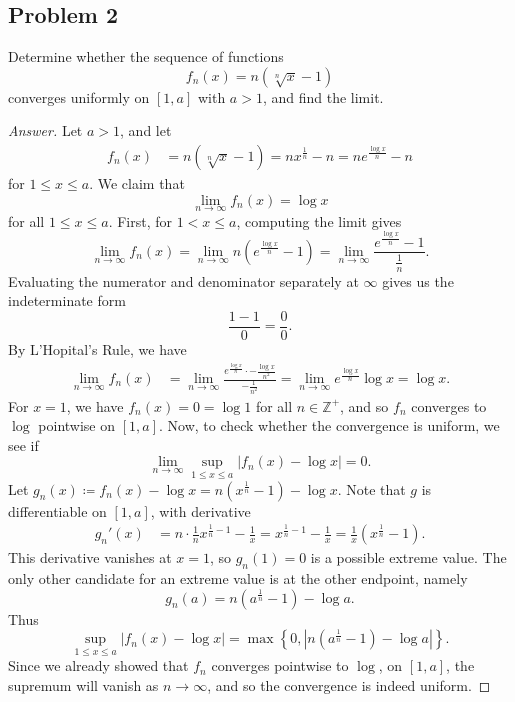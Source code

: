 \documentclass[12pt]{article}
\newcommand{\z}{\mathbb{Z}}
\newcommand\paren[1]{\left( #1 \right)}
\newcommand\setb[1]{\left \{ #1 \right \}}
\newcommand{\abs}[1]{\left | #1 \right |}
\theoremstyle{definition}
\begin{document}
\subsection{Problem 2}
Determine whether the sequence of functions
\[
    f_n(x) = n \paren{ \sqrt[n]{x} - 1 }
\]
converges uniformly on $[1,a]$ with $a > 1$, and find the limit.
\begin{proof}[Answer]
    Let $a > 1$, and let 
    \begin{align*}
        f_n(x) & = n \paren{ \sqrt[n]{x} - 1 } = n x^{\frac{1}{n}} - n = n e^{\frac{\log x}{n}} - n
    \end{align*}
    for $1 \leq x \leq a$. We claim that 
    \[
        \lim\limits_{n \to \infty} f_n(x) = \log x
    \]
    for all $1 \leq x \leq a$. First, for $1 < x \leq a$, computing the limit gives 
    \[
        \lim\limits_{n \to \infty} f_n(x) = \lim\limits_{n \to \infty} n \paren{ e^{\frac{\log x}{n}} - 1 } = \lim\limits_{n \to \infty} \frac{ e^{\frac{\log x}{n}} - 1 }{ \frac{1}{n} }.
    \]
    Evaluating the numerator and denominator separately at $\infty$ gives us the indeterminate form
    \[
        \frac{1 - 1}{0} = \frac{0}{0}.
    \]
    By L'Hopital's Rule, we have 
    \begin{align*}
        \lim\limits_{n \to \infty} f_n(x) & =  \lim\limits_{n \to \infty} \frac{ e^{\frac{\log x}{n}} \cdot -\frac{\log x}{n^2} }{-\frac{1}{n^2}} =  \lim\limits_{n \to \infty} e^{\frac{\log x}{n}} \log x = \log x.
    \end{align*}
    For $x = 1$, we have $f_n(x) = 0 = \log 1$ for all $n \in \z^+$, and so $f_n$ converges to $\log$ pointwise on $[1,a]$. 
    Now, to check whether the convergence is uniform, we see if 
    \[
        \lim\limits_{n \to \infty} \sup\limits_{1 \leq x \leq a} \abs{ f_n(x) - \log x } = 0.
    \]
    Let $g_n(x) \coloneqq f_n(x) - \log x = n \paren{ x^{\frac{1}{n}} - 1 } - \log x$. Note that $g$ is differentiable on $[1,a]$, with derivative
    \begin{align*}
        g_n'(x) & = n \cdot \frac{1}{n} x^{\frac{1}{n} - 1} - \frac{1}{x} = x^{\frac{1}{n} - 1} - \frac{1}{x} = \frac{1}{x} \paren{ x^{\frac{1}{n}} - 1 }.
    \end{align*}
    This derivative vanishes at $x = 1$, so $g_n(1) = 0$ is a possible extreme value. The only other candidate for an extreme value is at the other endpoint, namely
    \[
        g_n(a) = n \paren{ a^{\frac{1}{n}} - 1 } - \log a.
    \]
    Thus 
    \[
        \sup\limits_{1 \leq x \leq a} \abs{ f_n(x) - \log x } = \max \setb{ 0 , \abs{ n \paren{ a^{\frac{1}{n}} - 1 } - \log a } }.
    \]
    Since we already showed that $f_n$ converges pointwise to $\log$, on $[1,a]$, the supremum will vanish as $n \to \infty$, and so the convergence is indeed uniform. 
\end{proof}
\end{document}
